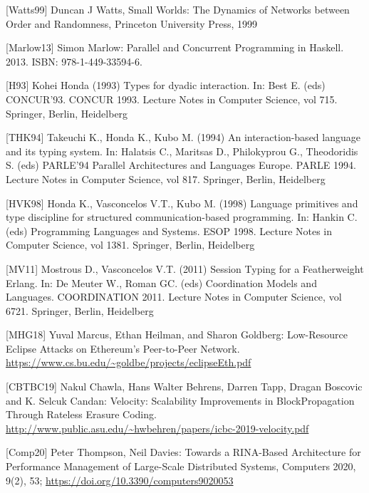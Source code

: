 \documentclass[11pt,a4paper]{article}
\begin{document}
{[}Watts99{]} Duncan J Watts, Small Worlds: The Dynamics of Networks
between Order and Randomness, Princeton University Press, 1999

{[}Marlow13{]} Simon Marlow: Parallel and Concurrent Programming in
Haskell. 2013. ISBN: 978-1-449-33594-6.

{[}H93{]} Kohei Honda (1993) Types for dyadic interaction. In: Best E.
(eds) CONCUR'93. CONCUR 1993. Lecture Notes in Computer Science, vol
715. Springer, Berlin, Heidelberg

{[}THK94{]} Takeuchi K., Honda K., Kubo M. (1994) An interaction-based
language and its typing system. In: Halatsis C., Maritsas D.,
Philokyprou G., Theodoridis S. (eds) PARLE'94 Parallel Architectures and
Languages Europe. PARLE 1994. Lecture Notes in Computer Science, vol
817. Springer, Berlin, Heidelberg

{[}HVK98{]} Honda K., Vasconcelos V.T., Kubo M. (1998) Language
primitives and type discipline for structured communication-based
programming. In: Hankin C. (eds) Programming Languages and Systems. ESOP
1998. Lecture Notes in Computer Science, vol 1381. Springer, Berlin,
Heidelberg

{[}MV11{]} Mostrous D., Vasconcelos V.T. (2011) Session Typing for a
Featherweight Erlang. In: De Meuter W., Roman GC. (eds) Coordination
Models and Languages. COORDINATION 2011. Lecture Notes in Computer
Science, vol 6721. Springer, Berlin, Heidelberg

{[}MHG18{]} Yuval Marcus, Ethan Heilman, and Sharon Goldberg:
Low-Resource Eclipse Attacks on Ethereum's Peer-to-Peer Network.
\href{https://www.cs.bu.edu/~goldbe/projects/eclipseEth.pdf}{{https://www.cs.bu.edu/\textasciitilde{}goldbe/projects/eclipseEth.pdf}}

{[}CBTBC19{]} Nakul Chawla, Hans Walter Behrens, Darren Tapp, Dragan
Boscovic and K. Selcuk Candan: Velocity: Scalability Improvements in
BlockPropagation Through Rateless Erasure Coding.
\href{http://www.public.asu.edu/~hwbehren/papers/icbc-2019-velocity.pdf}{{http://www.public.asu.edu/\textasciitilde{}hwbehren/papers/icbc-2019-velocity.pdf}}

{[}Comp20{]} Peter Thompson, Neil Davies: Towards a RINA-Based
Architecture for Performance Management of Large-Scale Distributed
Systems, Computers 2020, 9(2), 53;
\href{https://doi.org/10.3390/computers9020053}{{https://doi.org/10.3390/computers9020053}}
\end{document}

